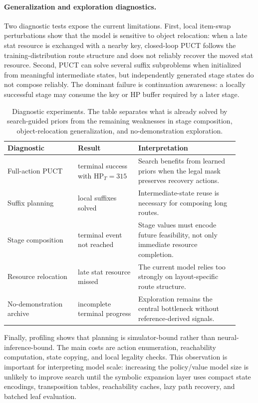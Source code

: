 \documentclass{article}
\begin{document}
\paragraph{Generalization and exploration diagnostics.}
Two diagnostic tests expose the current limitations.  First, local item-swap
perturbations show that the model is sensitive to object relocation: when a
late stat resource is exchanged with a nearby key, closed-loop PUCT follows the
training-distribution route structure and does not reliably recover the moved
stat resource.  Second, PUCT can solve several suffix subproblems when
initialized from meaningful intermediate states, but independently generated
stage states do not compose reliably.  The dominant failure is continuation
awareness: a locally successful stage may consume the key or HP buffer required
by a later stage.

\begin{table}[t]
\centering
\small
\begin{tabular}{@{}L{0.28\linewidth}L{0.24\linewidth}L{0.40\linewidth}@{}}
\toprule
Diagnostic & Result & Interpretation\\
\midrule
Full-action PUCT & terminal success with \(\mathrm{HP}_T=315\) & Search benefits from learned priors when the legal mask preserves recovery actions.\\
Suffix planning & local suffixes solved & Intermediate-state reuse is necessary for composing long routes.\\
Stage composition & terminal event not reached & Stage values must encode future feasibility, not only immediate resource completion.\\
Resource relocation & late stat resource missed & The current model relies too strongly on layout-specific route structure.\\
No-demonstration archive & incomplete terminal progress & Exploration remains the central bottleneck without reference-derived signals.\\
\bottomrule
\end{tabular}
\caption{Diagnostic experiments.  The table separates what is already solved by
search-guided priors from the remaining weaknesses in stage composition,
object-relocation generalization, and no-demonstration exploration.}
\label{tab:diagnostics}
\end{table}

Finally, profiling shows that planning is simulator-bound rather than
neural-inference-bound.  The main costs are action enumeration, reachability
computation, state copying, and local legality checks.  This observation is
important for interpreting model scale: increasing the policy/value model size
is unlikely to improve search until the symbolic expansion layer uses compact
state encodings, transposition tables, reachability caches, lazy path recovery,
and batched leaf evaluation.
\end{document}

